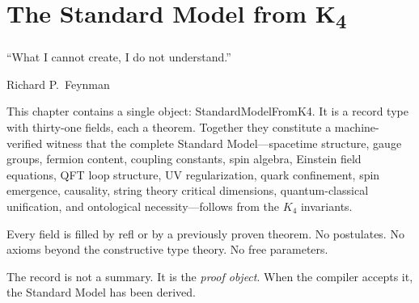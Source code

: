 \documentclass[11pt,a4paper]{book}
\def\texttt#1{#1}%
\newcommand{\VoidRef}[2]{\textit{#2} (in \textit{Void})}
\begin{document}
\begin{code}
\\
%
\>[2]\AgdaSpace{}%
\AgdaSymbol{=}\AgdaSpace{}%
\<%
\\
\>[2][@{}l@{\AgdaIndent{0}}]%
\>[4]\AgdaSymbol{\{}\AgdaSpace{}%
%
\>[24]\AgdaSymbol{=}\AgdaSpace{}%
\<%
\\
%
\>[4]\AgdaSymbol{;}\AgdaSpace{}%
%
\>[24]\AgdaSymbol{=}\AgdaSpace{}%
\<%
\\
%
\>[4]\AgdaSymbol{;}\AgdaSpace{}%
\AgdaSpace{}%
\AgdaSymbol{=}\AgdaSpace{}%
\<%
\\
%
\>[4]\AgdaSymbol{;}\AgdaSpace{}%
%
\>[24]\AgdaSymbol{=}\AgdaSpace{}%
\AgdaSpace{}%
\AgdaSymbol{\}}\<%
\end{code}

\chapter{The Standard Model from K\textsubscript{4}}
\label{ch:master-record}

\epigraph{``What I cannot create, I do not understand.''}{Richard P.~Feynman}

This chapter contains a single object: \texttt{StandardModelFromK4}. It is a record type with thirty-one fields, each a theorem. Together they constitute a machine-verified witness that the complete Standard Model---spacetime structure, gauge groups, fermion content, coupling constants, spin algebra, Einstein field equations, QFT loop structure, UV regularization, quark confinement, spin emergence, causality, string theory critical dimensions, quantum-classical unification, and ontological necessity---follows from the $K_4$ invariants.

Every field is filled by \texttt{refl} or by a previously proven theorem. No postulates. No axioms beyond the constructive type theory. No free parameters.

The record is not a summary. It is the \emph{proof object}. When the compiler accepts it, the Standard Model has been derived.

\end{document}
